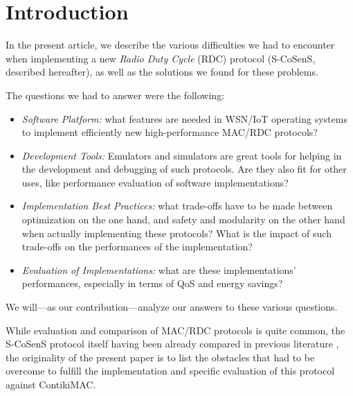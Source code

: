 \documentclass[12pt,a4paper]{article}
\begin{document}
\newtheorem{observ}{Lesson}



\section{Introduction}

In the present article, we describe the various difficulties we had
to encounter when implementing a new \emph{Radio Duty Cycle} (RDC) protocol
(S-CoSenS, described hereafter), as well as the solutions we found for
these problems.

The questions we had to answer were the following:
\begin{itemize}
\item \emph{Software Platform:} what features are needed in WSN/IoT operating
      systems to implement efficiently new high-performance MAC/RDC protocols?
\item \emph{Development Tools:} Emulators and simulators are great tools
      for helping in the development and debugging of such protocols.
      Are they also fit for other uses, like performance evaluation
      of software implementations?
\item \emph{Implementation Best Practices:} what trade-offs have to be made
      between optimization on the one hand, and safety and modularity on the
      other hand when actually implementing these protocols? What is the
      impact of such trade-offs on the performances of the implementation?
\item \emph{Evaluation of Implementations:} what are these implementations'
      performances, especially in terms of QoS and energy savings?
\end{itemize}

We will---as our contribution---analyze our answers to these various
questions.

While evaluation and comparison of MAC/RDC protocols is quite common,
the S-CoSenS protocol itself having been already compared in previous
literature \cite{iQueueMAC}, the originality of the present paper is
to list the obstacles that had to be overcome to fulfill the implementation
and specific evaluation of this protocol against ContikiMAC.
\end{document}
